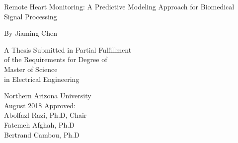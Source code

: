 \begin{center}
	
	{\Large 
	Remote Heart Monitoring: A Predictive Modeling Approach for Biomedical Signal Processing
	}
	
	\vfill
	
	By Jiaming Chen
	
	\vfill
A Thesis	
Submitted in Partial Fulfillment\\
of the Requirements for Degree of \\
Master of Science\\
 in Electrical Engineering

	\vfill
	Northern Arizona University\\
	August 2018
	\vfill
	Approved:\\
	Abolfazl Razi, Ph.D, Chair \\
	Fatemeh Afghah, Ph.D\\ 
    Bertrand Cambou, Ph.D	

	
\end{center}